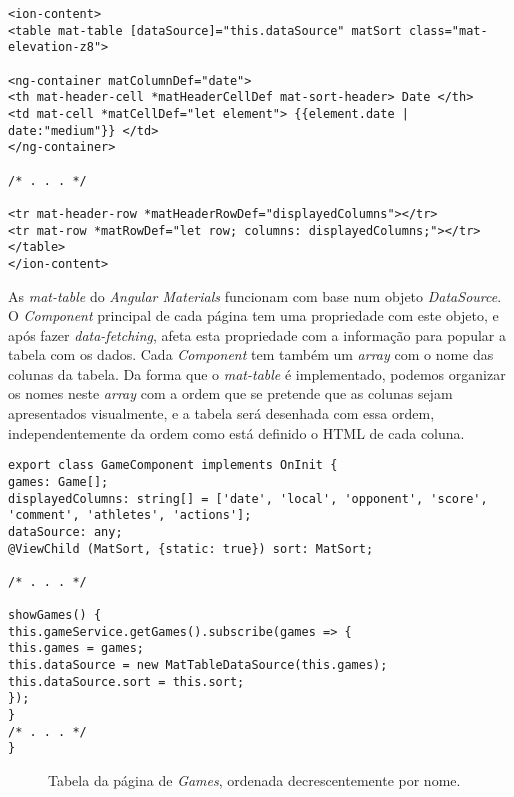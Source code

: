 \begin{lstlisting}
<ion-content>
<table mat-table [dataSource]="this.dataSource" matSort class="mat-elevation-z8">

<ng-container matColumnDef="date">
<th mat-header-cell *matHeaderCellDef mat-sort-header> Date </th>
<td mat-cell *matCellDef="let element"> {{element.date | date:"medium"}} </td>
</ng-container>

/* . . . */

<tr mat-header-row *matHeaderRowDef="displayedColumns"></tr>
<tr mat-row *matRowDef="let row; columns: displayedColumns;"></tr>
</table>
</ion-content>
\end{lstlisting}
As \textit{mat-table} do \textit{Angular Materials} funcionam com base num objeto \textit{DataSource}. O \textit{Component} principal de cada página tem uma propriedade com este objeto, e após fazer \textit{data-fetching}, afeta esta propriedade com a informação para popular a tabela com os dados. Cada \textit{Component} tem também um \textit{array} com o nome das colunas da tabela. Da forma que o \textit{mat-table} é implementado, podemos organizar os nomes neste \textit{array} com a ordem que se pretende que as colunas sejam apresentados visualmente, e a tabela será desenhada com essa ordem, independentemente da ordem como está definido o HTML de cada coluna. \\


\begin{lstlisting}
export class GameComponent implements OnInit {
games: Game[];
displayedColumns: string[] = ['date', 'local', 'opponent', 'score', 'comment', 'athletes', 'actions'];
dataSource: any;
@ViewChild (MatSort, {static: true}) sort: MatSort;

/* . . . */

showGames() {
this.gameService.getGames().subscribe(games => {
this.games = games;
this.dataSource = new MatTableDataSource(this.games);
this.dataSource.sort = this.sort;
});
}
/* . . . */
}
\end{lstlisting}

\begin{figure}[h]
	\begin{center}
	\end{center}
	\caption{Tabela da página de \textit{Games}, ordenada decrescentemente por nome.}\label{fig:gamessortednameup}
\end{figure}



